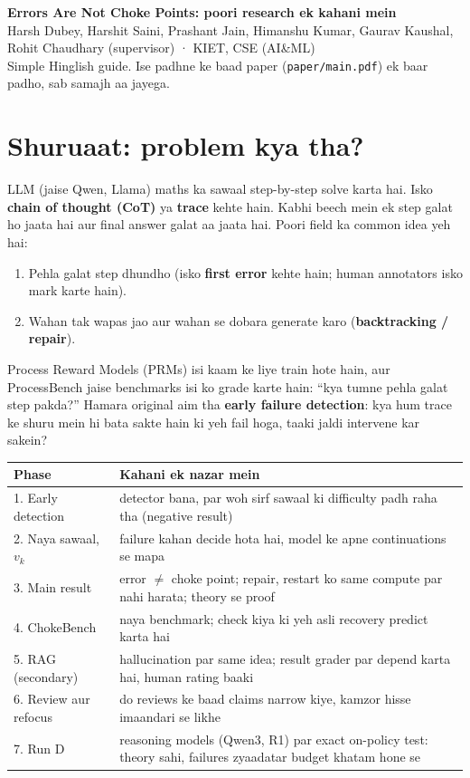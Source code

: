 \documentclass[10pt,a4paper]{article}
\begin{document}
\begin{center}
{\LARGE\bfseries Errors Are Not Choke Points: poori research ek kahani mein}\\[3pt]
{\small Harsh Dubey, Harshit Saini, Prashant Jain, Himanshu Kumar, Gaurav Kaushal, Rohit Chaudhary (supervisor) \;·\; KIET, CSE (AI\&ML)}\\[1pt]
{\small Simple Hinglish guide. Ise padhne ke baad paper (\texttt{paper/main.pdf}) ek baar padho, sab samajh aa jayega.}
\end{center}

\section{Shuruaat: problem kya tha?}
LLM (jaise Qwen, Llama) maths ka sawaal step-by-step solve karta hai. Isko \textbf{chain of thought (CoT)}
ya \textbf{trace} kehte hain. Kabhi beech mein ek step galat ho jaata hai aur final answer galat aa jaata hai.
Poori field ka common idea yeh hai:
\begin{enumerate}
\item Pehla galat step dhundho (isko \textbf{first error} kehte hain; human annotators isko mark karte hain).
\item Wahan tak wapas jao aur wahan se dobara generate karo (\textbf{backtracking / repair}).
\end{enumerate}
Process Reward Models (PRMs) isi kaam ke liye train hote hain, aur ProcessBench jaise benchmarks isi ko grade
karte hain: ``kya tumne pehla galat step pakda?'' Hamara original aim tha \textbf{early failure detection}:
kya hum trace ke shuru mein hi bata sakte hain ki yeh fail hoga, taaki jaldi intervene kar sakein?

\begin{center}\small
\begin{tabularx}{\textwidth}{lX}
\toprule
Phase & Kahani ek nazar mein \\
\midrule
1. Early detection & detector bana, par woh sirf sawaal ki difficulty padh raha tha (negative result) \\
2. Naya sawaal, $v_k$ & failure kahan decide hota hai, model ke apne continuations se mapa \\
3. Main result & error $\ne$ choke point; repair, restart ko same compute par nahi harata; theory se proof \\
4. ChokeBench & naya benchmark; check kiya ki yeh asli recovery predict karta hai \\
5. RAG (secondary) & hallucination par same idea; result grader par depend karta hai, human rating baaki \\
6. Review aur refocus & do reviews ke baad claims narrow kiye, kamzor hisse imaandari se likhe \\
7. Run D & reasoning models (Qwen3, R1) par exact on-policy test: theory sahi, failures zyaadatar budget khatam hone se \\
\bottomrule
\end{tabularx}
\end{center}
\end{document}
